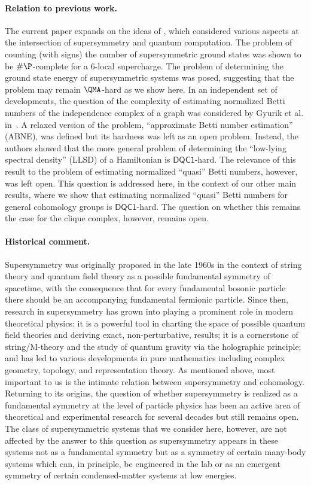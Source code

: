 \documentclass[11pt]{article}
\numberwithin{equation}{section}
\newcommand{\DQC}{\mathsf{DQC1}}
\renewcommand\( {\left(}
\renewcommand\) {\right)}
\begin{document}
\paragraph{Relation to previous work.} The current paper expands on the ideas  of \cite{Crichigno:2020vue}, which considered various aspects at the intersection of supersymmetry and quantum computation. The problem of counting (with signs) the number of supersymmetric ground states was shown to be $\#\P$-complete for a  $6$-local supercharge. The problem of determining the ground state energy of supersymmetric systems was posed, suggesting that the problem may remain $\QMA$-hard as we show here. In an independent set of developments, the question of the complexity of estimating normalized Betti numbers of the independence complex of a graph was considered by Gyurik et al. in~\cite{gyurik}. A relaxed version of the problem, ``approximate Betti number estimation'' (ABNE), was defined but its hardness  was left as an open problem. Instead, the authors showed that the more general problem of determining the ``low-lying spectral density'' (LLSD) of a Hamiltonian is  $\DQC$-hard. The relevance of this result to the problem of estimating normalized ``quasi'' Betti numbers, however, was left open. This question is addressed here, in the context of our other main results, where we show that estimating normalized ``quasi'' Betti numbers for general cohomology groups is $\DQC$-hard. The question on whether this remains the case for the clique complex, however, remains open. 


\paragraph{Historical comment. }  Supersymmetry was originally proposed in the late 1960s in the context of string theory and quantum field theory as a possible fundamental symmetry of spacetime, with the consequence that for every fundamental bosonic particle there should be an accompanying fundamental fermionic particle. Since then, research in supersymmetry has grown into playing a prominent role in modern theoretical physics:  it is a powerful tool in charting the space of possible quantum field theories and deriving exact, non-perturbative, results; it is a cornerstone of string/M-theory and the study of quantum gravity via the holographic principle; and has led to various developments in pure mathematics including complex geometry, topology, and representation theory. As  mentioned above,  most important to us is the intimate relation between supersymmetry and cohomology. Returning to its origins, the question of whether supersymmetry is  realized as a fundamental symmetry at the level of particle physics has been an active area of theoretical and experimental research for several decades but still remains open. The class of supersymmetric systems that we consider here, however, are not affected by the answer to this question as supersymmetry appears in these systems not as a fundamental symmetry but as a symmetry of certain many-body systems which can, in principle, be engineered in the lab or as an emergent symmetry of certain condensed-matter systems at low energies. 
\end{document}
